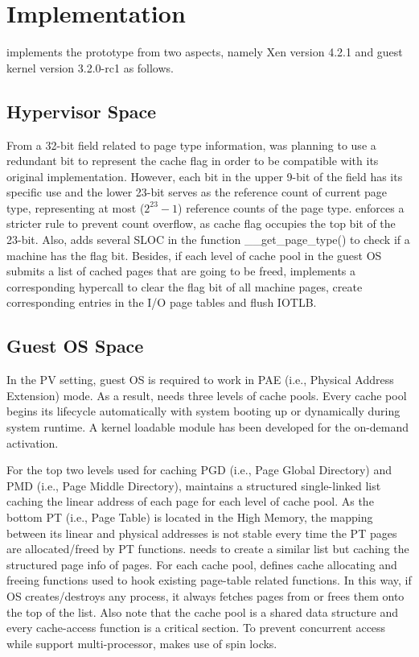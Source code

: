\section{Implementation} \label{sec:implementation}

\name implements the prototype from two aspects, namely Xen version 4.2.1 and guest kernel version 3.2.0-rc1 as follows.

\subsection{Hypervisor Space}

From a 32-bit field related to page type information, \name was planning to use a redundant bit to represent the cache flag in order to be compatible with its original implementation. However, each bit in the upper 9-bit of the field has its specific use and the lower 23-bit serves as the reference count of current page type, representing at most ($2^23-1$) reference counts of the page type. \name enforces a stricter rule to prevent count overflow, as cache flag occupies the top bit of the 23-bit. Also, \name adds several SLOC in the function \_\_get\_page\_type() to check if a machine has the flag bit. Besides, if each level of cache pool in the guest OS submits a list of cached pages that are going to be freed, \name implements a corresponding hypercall to clear the flag bit of all machine pages, create corresponding entries in the I/O page tables and flush IOTLB.

\subsection{Guest OS Space}

In the PV setting, guest OS is required to work in PAE (i.e., Physical Address Extension) mode. As a result, \name needs three levels of cache pools. Every cache pool begins its lifecycle automatically with system booting up or dynamically during system runtime. A kernel loadable module has been developed for the on-demand activation. 

For the top two levels used for caching PGD (i.e., Page Global Directory) and PMD (i.e., Page Middle Directory), \name maintains a structured single-linked list caching the linear address of each page for each level of cache pool. As the bottom PT (i.e., Page Table) is located in the High Memory, the mapping between its linear and physical addresses is not stable every time the PT pages are allocated/freed by PT functions. \name needs to create a similar list but caching the structured page info of pages. For each cache pool, \name defines cache allocating and freeing functions used to hook existing page-table related functions. In this way, if OS creates/destroys any process, it always fetches pages from or frees them onto the top of the list. Also note that the cache pool is a shared data structure and every cache-access function is a critical section. To prevent concurrent access while support multi-processor, \name makes use of spin locks. 

